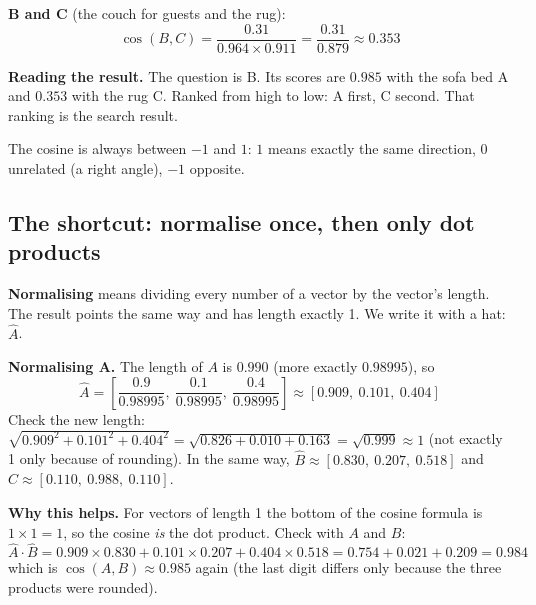 \documentclass[11pt,a4paper]{article}
\begin{document}
\textbf{B and C} (the couch for guests and the rug):
\[
\cos(B, C) = \frac{0.31}{0.964 \times 0.911}
  = \frac{0.31}{0.879}
  \approx \mathbf{0.353}
\]

\textbf{Reading the result.} The question is B. Its scores are $0.985$
with the sofa bed A and $0.353$ with the rug C. Ranked from high to low:
A first, C second. That ranking is the search result.

The cosine is always between $-1$ and $1$: $1$ means exactly the same
direction, $0$ unrelated (a right angle), $-1$ opposite.

\subsection{The shortcut: normalise once, then only dot products}

\textbf{Normalising} means dividing every number of a vector by the
vector's length. The result points the same way and has length exactly
1. We write it with a hat: $\hat{A}$.

\textbf{Normalising A.} The length of $A$ is $0.990$ (more exactly
$0.98995$), so
\[
\hat{A} = \left[\frac{0.9}{0.98995},\ \frac{0.1}{0.98995},\
  \frac{0.4}{0.98995}\right] \approx [0.909,\ 0.101,\ 0.404]
\]
Check the new length:
$\sqrt{0.909^2 + 0.101^2 + 0.404^2} = \sqrt{0.826 + 0.010 + 0.163}
= \sqrt{0.999} \approx 1$ (not exactly 1 only because of rounding).
In the same way, $\hat{B} \approx [0.830,\ 0.207,\ 0.518]$ and
$\hat{C} \approx [0.110,\ 0.988,\ 0.110]$.

\textbf{Why this helps.} For vectors of length 1 the bottom of the
cosine formula is $1 \times 1 = 1$, so the cosine \emph{is} the dot
product. Check with $A$ and $B$:
\[
\hat{A} \cdot \hat{B} = 0.909 \times 0.830 + 0.101 \times 0.207 + 0.404
\times 0.518 = 0.754 + 0.021 + 0.209 = 0.984
\]
which is $\cos(A, B) \approx 0.985$ again (the last digit differs only
because the three products were rounded).
\end{document}
